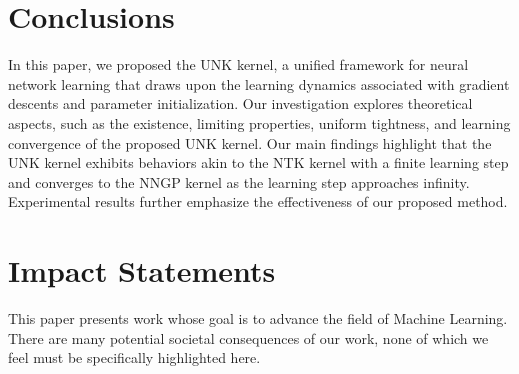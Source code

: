 \documentclass[review,10pt]{JMtemplate}
\begin{document}
\section{Conclusions}  \label{sec:conclusions}
In this paper, we proposed the UNK kernel, a unified framework for neural network learning that draws upon the learning dynamics associated with gradient descents and parameter initialization. Our investigation explores theoretical aspects, such as the existence, limiting properties, uniform tightness, and learning convergence of the proposed UNK kernel. Our main findings highlight that the UNK kernel exhibits behaviors akin to the NTK kernel with a finite learning step and converges to the NNGP kernel as the learning step approaches infinity. Experimental results further emphasize the effectiveness of our proposed method.


\section*{Impact Statements}
This paper presents work whose goal is to advance the field of Machine Learning. There are many potential societal consequences of our work, none of which we feel must be specifically highlighted here.






\newpage
\appendix
\onecolumn
\end{document}
